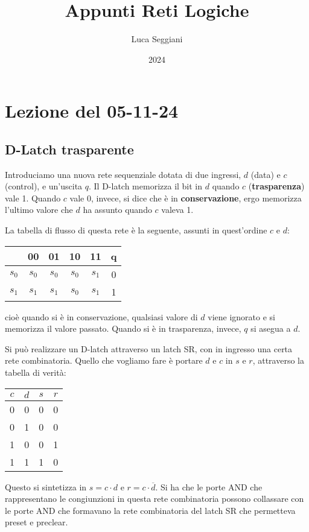 \documentclass[a4paper,11pt]{article}
\title{Appunti Reti Logiche}
\author{Luca Seggiani}
\date{2024}
\begin{document}
\section{Lezione del 05-11-24}

\thispagestyle{empty}
\pagestyle{fancy}

\subsection{D-Latch trasparente}
Introduciamo una nuova rete sequenziale dotata di due ingressi, $d$ (data) e $c$ (control), e un'uscita $q$.
Il D-latch memorizza il bit in $d$ quando $c$ (\textbf{trasparenza}) vale 1.
Quando $c$ vale 0, invece, si dice che è in \textbf{conservazione}, ergo memorizza l'ultimo valore che $d$ ha assunto quando $c$ valeva 1.

La tabella di flusso di questa rete è la seguente, assunti in quest'ordine $c$ e $d$:
\begin{table}[h!]
	\center 
	\begin{tabular} { c | c | c | c | c || c }
		& 00 & 01 & 10 & 11 & q \\ 
		\hline 
		$s_0$ & $s_0$ & $s_0$ & $s_0$ & $s_1$ & 0 \\ 
		$s_1$ & $s_1$ & $s_1$ & $s_0$ & $s_1$ & 1\\
	\end{tabular}
\end{table}

cioè quando si è in conservazione, qualsiasi valore di $d$ viene ignorato e si memorizza il valore passato.
Quando si è in trasparenza, invece, $q$ si asegua a $d$.

Si può realizzare un D-latch attraverso un latch SR, con in ingresso una certa rete combinatoria.
Quello che vogliamo fare è portare $d$ e $c$ in $s$ e $r$, attraverso la tabella di verità:
\begin{table}[H]
	\center 
	\begin{tabular} { c  c | c  c }
		$c$ & $d$ & $s$ & $r$ \\
		\hline
		0 & 0 & 0 & 0 \\ 
		0 & 1 & 0 & 0 \\ 
		1 & 0 & 0 & 1 \\ 
		1 & 1 & 1 & 0
	\end{tabular}
\end{table}

Questo si sintetizza in $s = c \cdot d$ e $r = c \cdot \overline{d}$.
Si ha che le porte AND che rappresentano le congiunzioni in questa rete combinatoria possono collassare con le porte AND che formavano la rete combinatoria del latch SR che permetteva preset e preclear.
\end{document}
